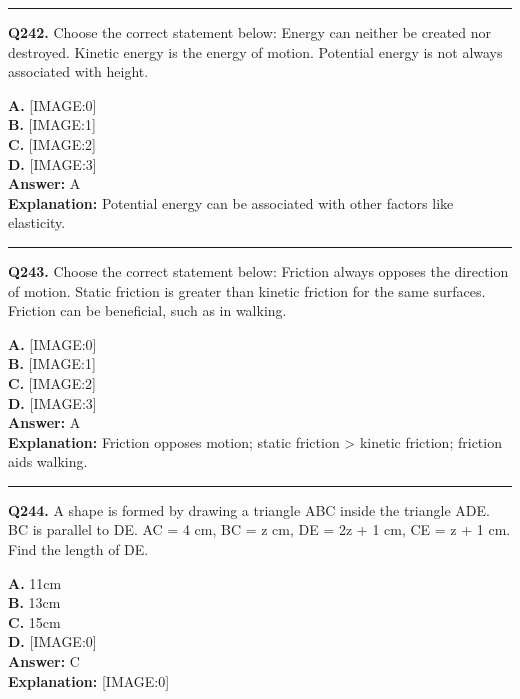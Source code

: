 \documentclass[12pt]{article}
\begin{document}
\hrule
\vspace{1em}


\noindent
\textbf{Q242.} Choose the correct statement below:
Energy can neither be created nor destroyed.
Kinetic energy is the energy of motion.
Potential energy is not always associated with height.



\textbf{A.} [IMAGE:0] \\
\textbf{B.} [IMAGE:1] \\
\textbf{C.} [IMAGE:2] \\
\textbf{D.} [IMAGE:3] \\

\textbf{Answer:} A \\
\textbf{Explanation:} Potential energy can be associated with other factors like elasticity.

\hrule
\vspace{1em}


\noindent
\textbf{Q243.} Choose the correct statement below:
Friction always opposes the direction of motion.
Static friction is greater than kinetic friction for the same surfaces.
Friction can be beneficial, such as in walking.



\textbf{A.} [IMAGE:0] \\
\textbf{B.} [IMAGE:1] \\
\textbf{C.} [IMAGE:2] \\
\textbf{D.} [IMAGE:3] \\

\textbf{Answer:} A \\
\textbf{Explanation:} Friction opposes motion; static friction > kinetic friction; friction aids walking.

\hrule
\vspace{1em}


\noindent
\textbf{Q244.} A shape is formed by drawing a triangle ABC inside the triangle ADE. BC is parallel to DE. AC = 4 cm, BC = z cm, DE = 2z + 1 cm, CE = z + 1 cm.
Find the length of DE.



\textbf{A.} 11cm \\
\textbf{B.} 13cm \\
\textbf{C.} 15cm \\
\textbf{D.} [IMAGE:0] \\

\textbf{Answer:} C \\
\textbf{Explanation:} [IMAGE:0]
\end{document}
